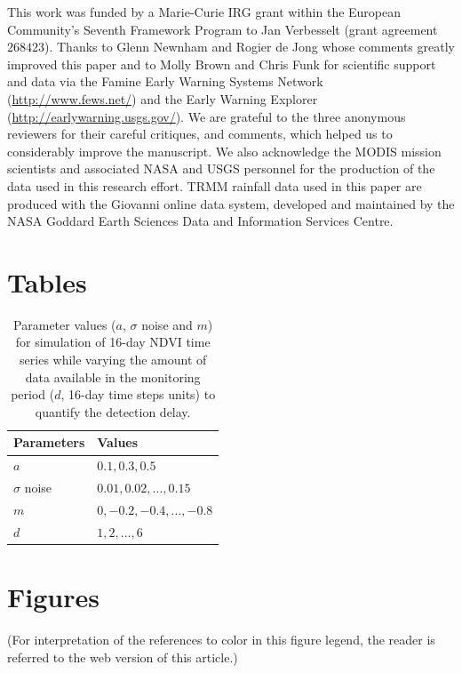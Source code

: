\documentclass[authoryear,preprint,review,10pt]{elsarticle}
\begin{document}
This work was funded by a Marie-Curie IRG grant within the European Community's Seventh Framework Program to Jan Verbesselt (grant agreement $268423$). Thanks to Glenn Newnham and Rogier de Jong whose comments greatly improved this paper and to Molly Brown and Chris Funk for scientific support and data via the Famine Early Warning Systems Network (\url{http://www.fews.net/}) and the Early Warning Explorer (\url{http://earlywarning.usgs.gov/}). We are grateful to the three anonymous reviewers for their careful critiques, and comments, which helped us to considerably improve the manuscript. We also acknowledge the MODIS mission scientists and associated NASA and USGS personnel for the production of the data used in this research effort. TRMM rainfall data used in this paper are produced with the Giovanni online data system, developed and maintained by the NASA Goddard Earth Sciences Data and Information Services Centre.



\newpage

\section*{Tables}

\begin{table}[htb]
\caption{Parameter values ($a$, $\sigma$ noise and $m$) for simulation of 16-day NDVI time series while varying the amount of data available in the monitoring period ($d$, 16-day time steps units) to quantify the detection delay.}
\centering
\begin{tabular}{ll}
  \hline
  Parameters & Values \\ [0.5ex]
  \hline
  $a$         & $0.1, 0.3, 0.5$ \\
  $\sigma$ noise    & $0.01,0.02,\dots,0.15$ \\
  $m$         & $0, -0.2, -0.4, \dots, -0.8$ \\
  $d$   & $1, 2, \dots, 6$ \\ [.5ex]
  \hline
\end{tabular}
\label{table:simpar}
\end{table}

\newpage

\section*{Figures}

 (For interpretation of the references to color in this figure legend, the reader is referred to the web
 version of this article.)
\end{document}
